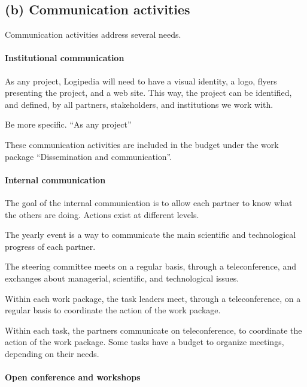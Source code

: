\subsection*{(b) Communication activities}

Communication activities address several needs.

\paragraph*{Institutional communication}

As any project, Logipedia will need to have a visual identity, a logo,
flyers presenting the project, and a web site.
This way, the project can be identified, and defined, by all partners,
stakeholders, and institutions we work with.

{\color{red} Be more specific. ``As any project''}

These communication activities are included in the budget under the
work package ``Dissemination and communication''.

\paragraph*{Internal communication}

The goal of the internal communication is to allow each partner to
know what the others are doing. Actions exist at different levels.

\begin{compactitem}
\item The yearly event is a way to communicate the main scientific and
  technological progress of each partner.
\item The steering committee meets on a regular basis, through a
  teleconference, and exchanges about managerial, scientific, and
  technological issues.
\item Within each work package, the task leaders meet, through a
  teleconference, on a regular basis to coordinate the action of the
  work package.
\item Within each task, the partners communicate on teleconference, to
  coordinate the action of the work package. Some tasks have a budget
  to organize meetings, depending on their needs.
\end{compactitem}

\paragraph*{Open conference and workshops}

